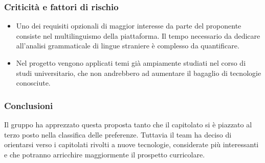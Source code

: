 \subsubsection{Criticità e fattori di rischio}
\begin{itemize}
	\item Uno dei requisiti opzionali di maggior interesse da parte del proponente consiste nel multilinguismo della piattaforma. Il tempo necessario da dedicare all'analisi grammaticale di lingue straniere è complesso da quantificare.
	
	\item Nel progetto vengono applicati temi già ampiamente studiati nel corso di studi universitario, che non andrebbero ad aumentare il bagaglio di tecnologie conosciute.
 	
\end{itemize}
\subsubsection{Conclusioni}
Il gruppo ha apprezzato questa proposta tanto che il capitolato si è piazzato al terzo posto nella classifica delle preferenze. Tuttavia il team ha deciso di orientarsi verso i capitolati rivolti a nuove tecnologie, considerate più interessanti e che potranno arricchire maggiormente il prospetto curricolare. 



